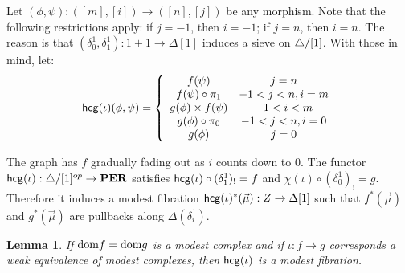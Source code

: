 \documentclass{amsart}
\theoremstyle{plain}
\newtheorem{lemma}[theorem]{Lemma}
\theoremstyle{definition}
\newcommand\ri{^*}
\begin{document}
Let $(\phi,\psi):([m],[i]) \to ([n],[j])$ be any morphism. Note that the following restrictions apply: if $j=-1$, then $i=-1$; if $j=n$, then $i=n$. The reason is that $(\delta^1_0,\delta^1_1):1+1\to \Delta[1]$ induces a sieve on ${\mathord{\triangle}}/[1]$. With those in mind, let:
\[ \mathsf{hcg}(\iota)(\phi,\psi) = \left\{\begin{array}{cc}
f(\psi) & j=n\\
f(\psi)\circ \pi_1 & -1 < j < n, i=m\\
g(\phi) \times f(\psi) & -1<i<m\\
g(\phi)\circ\pi_0 & -1< j < n, i=0\\
g(\phi) & j=0
\end{array}\right.\]

The graph has $f$ gradually fading out as $i$ counts down to $0$. The functor $\mathsf{hcg}(\iota):{\mathord{\triangle}}/[1]^{op}\to\mathbf{PER}$ satisfies $\mathsf{hcg}(\iota)\circ(\delta^1_1)_! = f$ and $\chi(\iota)\circ(\delta^1_0)_! = g$. Therefore it induces a modest fibration $\hcg(\iota)\ri(\vec \mu): Z\to \Delta[1]$ such that $f\ri(\vec \mu)$ and $g\ri(\vec \mu)$ are pullbacks along $\Delta(\delta_i^1)$.

\begin{lemma} If $\mathrm{dom} f=\mathrm{dom} g$ is a modest complex and if $\iota:f\to g$ corresponds a weak equivalence of modest complexes, then $\mathsf{hcg}(\iota)$ is a modest fibration. \end{lemma}
\end{document}
